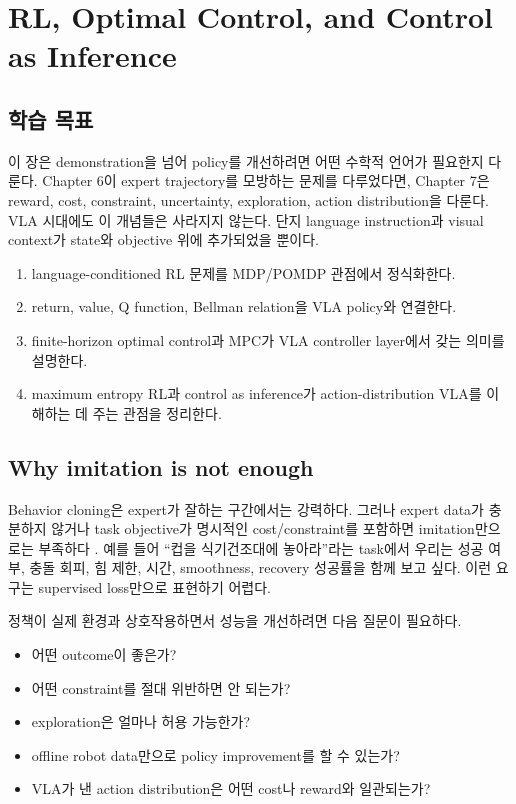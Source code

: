 \chapter{RL, Optimal Control, and Control as Inference}

\section*{학습 목표}

이 장은 demonstration을 넘어 policy를 개선하려면 어떤 수학적 언어가 필요한지 다룬다. Chapter 6이 expert trajectory를 모방하는 문제를 다루었다면, Chapter 7은 reward, cost, constraint, uncertainty, exploration, action distribution을 다룬다. VLA 시대에도 이 개념들은 사라지지 않는다. 단지 language instruction과 visual context가 state와 objective 위에 추가되었을 뿐이다.

\begin{enumerate}
  \item language-conditioned RL 문제를 MDP/POMDP 관점에서 정식화한다.
  \item return, value, Q function, Bellman relation을 VLA policy와 연결한다.
  \item finite-horizon optimal control과 MPC가 VLA controller layer에서 갖는 의미를 설명한다.
  \item maximum entropy RL과 control as inference가 action-distribution VLA를 이해하는 데 주는 관점을 정리한다.
\end{enumerate}

\section{Why imitation is not enough}

Behavior cloning은 expert가 잘하는 구간에서는 강력하다. 그러나 expert data가 충분하지 않거나 task objective가 명시적인 cost/constraint를 포함하면 imitation만으로는 부족하다 \cite{sutton2018,haarnoja2018sac,kumar2020cql}. 예를 들어 ``컵을 식기건조대에 놓아라''라는 task에서 우리는 성공 여부, 충돌 회피, 힘 제한, 시간, smoothness, recovery 성공률을 함께 보고 싶다. 이런 요구는 supervised loss만으로 표현하기 어렵다.

정책이 실제 환경과 상호작용하면서 성능을 개선하려면 다음 질문이 필요하다.

\begin{itemize}
  \item 어떤 outcome이 좋은가?
  \item 어떤 constraint를 절대 위반하면 안 되는가?
  \item exploration은 얼마나 허용 가능한가?
  \item offline robot data만으로 policy improvement를 할 수 있는가?
  \item VLA가 낸 action distribution은 어떤 cost나 reward와 일관되는가?
\end{itemize}

